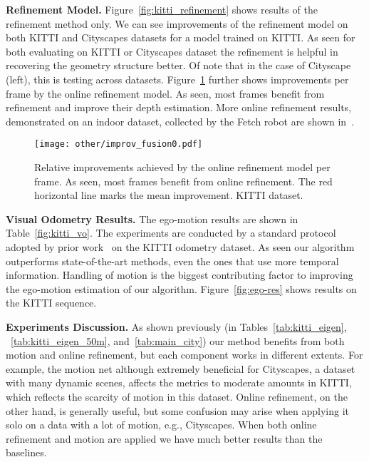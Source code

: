 \documentclass[10pt,twocolumn,letterpaper]{article}
\begin{document}
\textbf{Refinement Model.}
Figure~\ref{fig:kitti_refinement} shows results of the refinement method only.
We can see improvements of the refinement model on both KITTI and Cityscapes datasets for a model trained on KITTI.
As seen for both evaluating on KITTI or Cityscapes dataset the refinement is helpful in recovering the geometry structure better.
Of note that in the case of Cityscape (left), this is testing across datasets.
Figure~\ref{fig:kitti_fusion_delta} further shows improvements per frame by the online refinement model. As seen, most frames benefit from refinement and improve their depth estimation. More online refinement results, demonstrated on an indoor dataset, collected by the Fetch robot are shown in~\cite{casser2019depth}.

\begin{figure}
    \begin{center}
    \texttt{[image: other/improv\_fusion0.pdf]}
    \end{center}
    \caption{Relative improvements achieved by the online refinement model per frame. As seen, most frames benefit from online refinement. The red horizontal line marks the mean improvement. KITTI dataset. }
    \label{fig:kitti_fusion_delta}
\end{figure}

\textbf{Visual Odometry Results.}
The ego-motion results are shown in Table~\ref{fig:kitti_vo}. The experiments are conducted by a standard protocol adopted by prior work~\cite{zhou2017unsupervised,godard2018digging} on the KITTI odometry dataset. As seen our algorithm outperforms state-of-the-art methods, even the ones that use more temporal information.  Handling of motion is the biggest contributing  factor to improving the ego-motion estimation of our algorithm. Figure~\ref{fig:ego-res} shows results on the KITTI sequence.

\textbf{Experiments Discussion.}
As shown previously (in Tables~\ref{tab:kitti_eigen}, ~\ref{tab:kitti_eigen_50m}, and~\ref{tab:main_city}) our method benefits from both motion and online refinement, but each component works in different extents.
For example, the motion net although extremely beneficial for City\-scapes, a dataset with many dynamic scenes, affects the metrics to moderate amounts in KITTI, which reflects the scarcity of motion in this dataset. Online refinement, on the other hand, is generally useful, but some confusion may arise when applying it solo on a data with a lot of motion, e.g., City\-scapes. When both online refinement and motion are applied we have much better results than the baselines.
\end{document}
